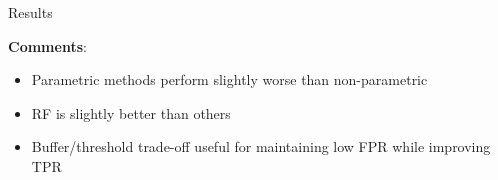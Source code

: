 \begin{frame}{Results}
\begin{minipage}[t]{0.7\linewidth}
\textbf{Comments}:
    \begin{itemize}
        \item Parametric methods perform slightly worse than non-parametric
        \item RF is slightly better than others
        \item Buffer/threshold trade-off useful for maintaining low FPR while improving TPR
    \end{itemize}
\end{minipage}

\end{frame}